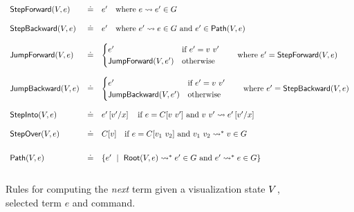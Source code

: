 \begin{figure*}[t]
\[
\begin{array}{lcl}
\stepforward{\vstate}{e}  & \defeq
  & e' \quad \mbox{where } \singlestep{e}{e'} \in \tr \\ \\

\stepbackward{\vstate}{e} & \defeq
  & e' \quad \mbox{where } \singlestep{e'}{e} \in \tr \mbox{ and } e' \in \vpath{\vstate}{e} \\ \\

\jumpforward{\vstate}{e} & \defeq
  & \begin{cases}
    e'                         & \mbox{if } e' = \eapp{v}{v'} \\
    \jumpforward{\vstate}{e'}  & \text{otherwise}
    \end{cases}
    \mbox{\qquad where } e' = \stepforward{\vstate}{e} \\ \\

\jumpbackward{\vstate}{e} & \defeq
  & \begin{cases}
    e'                         & \mbox{if } e' = \eapp{v}{v'} \\
    \jumpbackward{\vstate}{e'} & \text{otherwise}
    \end{cases}
    \mbox{\qquad where } e' = \stepbackward{\vstate}{e} \\ \\

\stepinto{\vstate}{e} & \defeq
  & e'\sub{x}{v'} \quad \mbox{if } e = C[\eapp{v}{v'}] \mbox{ and } \singlestep{\eapp{v}{v'}}{e'\sub{x}{v'}}  \\ \\

\stepover{\vstate}{e} & \defeq
  & C[v] \quad \mbox{if } e = C[\eapp{v_1}{v_2}] \mbox{ and } \multistep{\eapp{v_1}{v_2}}{v} \in \tr \\[0.25in]

\vpath{\vstate}{e} & \defeq
  & \{e' \spmid \multistep{\vroot{\vstate}{e}}{e'} \in \tr
                \mbox{ and }
                \multistep{e'}{e} \in \tr \} \\[0.15in]
\end{array}
\]
\caption{Rules for computing the \emph{next} term given a
         visualization state $\vstate$, selected term $e$
         and command.}
\label{fig:traversing-graph}
\end{figure*}
